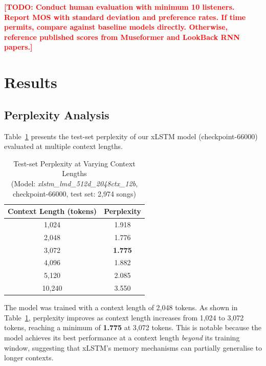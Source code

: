 \documentclass[conference]{IEEEtran}
\newcommand{\TODO}[1]{\textcolor{red}{\textbf{[TODO: #1]}}}
\begin{document}
\TODO{Conduct human evaluation with minimum 10 listeners. Report MOS with
standard deviation and preference rates. If time permits, compare against
baseline models directly. Otherwise, reference published scores from
Museformer and LookBack RNN papers.}

\section{Results}
\label{sec:results}

\subsection{Perplexity Analysis}
\label{ssec:ppl}

Table~\ref{tab:ppl_results} presents the test-set perplexity of our
xLSTM model (checkpoint-66000) evaluated at multiple context lengths.

\begin{table}[t]
  \caption{Test-set Perplexity at Varying Context Lengths\\
           (Model: \textit{xlstm\_lmd\_512d\_2048ctx\_12b},
            checkpoint-66000, test set: 2,974 songs)}
  \label{tab:ppl_results}
  \centering
  \renewcommand{\arraystretch}{1.2}
  \begin{tabular}{@{}cc@{}}
    \toprule
    \textbf{Context Length (tokens)} & \textbf{Perplexity} \\
    \midrule
    1,024  & 1.918 \\
    2,048  & 1.776 \\
    3,072  & \textbf{1.775} \\
    4,096  & 1.882 \\
    5,120  & 2.085 \\
    10,240 & 3.550 \\
    \bottomrule
  \end{tabular}
\end{table}

The model was trained with a context length of 2,048 tokens. As shown
in Table~\ref{tab:ppl_results}, perplexity improves as context length
increases from 1,024 to 3,072 tokens, reaching a minimum of
\textbf{1.775} at 3,072 tokens. This is notable because the model
achieves its best performance at a context length \emph{beyond} its
training window, suggesting that xLSTM's memory mechanisms can
partially generalise to longer contexts.
\end{document}
